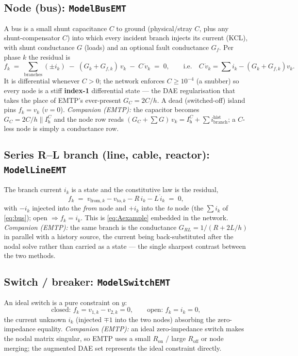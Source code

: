 \documentclass[11pt]{article}
\newcommand{\hstep}{h}
\begin{document}
\subsection{Node (bus): \texttt{ModelBusEMT}}
A bus is a small shunt capacitance $C$ to ground (physical/stray $C$, plus any
shunt-compensator $C$) into which every incident branch injects its current
(KCL), with shunt conductance $G$ (loads) and an optional fault conductance
$G_f$. Per phase $k$ the residual is
\begin{equation}
f_k \;=\; \sum_{\text{branches}}(\pm i_k)\;-\;(G_k+G_{f,k})\,v_k\;-\;C\,\dot v_k
\;=\;0,
\qquad\text{i.e.}\quad C\,\dot v_k=\textstyle\sum i_k-(G_k+G_{f,k})v_k .
\label{eq:bus}
\end{equation}
It is differential whenever $C>0$; the network enforces $C\ge 10^{-4}$ (a snubber)
so every node is a stiff \textbf{index-1} differential state --- the DAE
regularisation that takes the place of EMTP's ever-present $G_C=2C/\hstep$. A
dead (switched-off) island pins $f_k=v_k$ ($v=0$).
\emph{Companion (EMTP):} the capacitor becomes $G_C=2C/\hstep \parallel
I_{\mathrm h}^C$ and the node row reads $(G_C+\sum G)\,v_k=I_{\mathrm h}^C+\sum
i^{\text{hist}}_{\text{branch}}$; a $C$-less node is simply a conductance row.

\subsection{Series R--L branch (line, cable, reactor): \texttt{ModelLineEMT}}
The branch current $i_k$ is a state and the constitutive law is the residual,
\begin{equation}
f_k \;=\; v_{\mathrm{from},k}-v_{\mathrm{to},k}-R\,i_k-L\,\dot i_k \;=\;0,
\label{eq:line}
\end{equation}
with $-i_k$ injected into the \emph{from} node and $+i_k$ into the \emph{to} node
(the $\sum i_k$ of \eqref{eq:bus}); open $\Rightarrow f_k=i_k$. This is
\eqref{eq:Aexample} embedded in the network. \emph{Companion (EMTP):} the same
branch is the conductance $G_{RL}=1/(R+2L/\hstep)$ in parallel with a history
source, the current being back-substituted after the nodal solve rather than
carried as a state --- the single sharpest contrast between the two methods.

\subsection{Switch / breaker: \texttt{ModelSwitchEMT}}
An ideal switch is a pure constraint on $y$:
\begin{equation}
\text{closed: } f_k=v_{1,k}-v_{2,k}=0,
\qquad
\text{open: } f_k=i_k=0,
\label{eq:switch}
\end{equation}
the current unknown $i_k$ (injected $\mp1$ into the two nodes) absorbing the
zero-impedance equality. \emph{Companion (EMTP):} an ideal zero-impedance switch
makes the nodal matrix singular, so EMTP uses a small $R_{\mathrm{on}}$ / large
$R_{\mathrm{off}}$ or node merging; the augmented DAE set represents the ideal
constraint directly.
\end{document}
